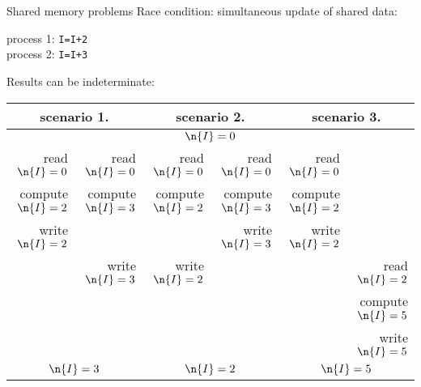 \begin{frame}[containsverbatim]{Shared memory problems}
Race condition: simultaneous update of shared data:
\begin{tabbing}
  process 1: \texttt{I=I+2}\\
  process 2: \texttt{I=I+3}
\end{tabbing}
Results can be indeterminate:

\tiny
\begin{tabular}{|rr|rr|rr|}
  \hline
  \multicolumn{2}{|c|}{scenario 1.}& \multicolumn{2}{|c|}{scenario 2.}&
  \multicolumn{2}{|c|}{scenario 3.}\\ \hline
  \multicolumn{6}{|c|}{$\n{I}=0$}\\ \hline
  read $\n{I}=0$&read $\n{I}=0$&
    read $\n{I}=0$&read $\n{I}=0$&
      read $\n{I}=0$& \\
  compute $\n{I}=2$&compute $\n{I}=3$& 
    compute $\n{I}=2$&compute $\n{I}=3$&
      compute $\n{I}=2$& \\
  write $\n{I}=2$& & &write $\n{I}=3$&write $\n{I}=2$& \\
  &write $\n{I}=3$&write $\n{I}=2$& & &read $\n{I}=2$\\
  &&&&&compute $\n{I}=5$\\
  &&&&&write $\n{I}=5$\\
  \hline
  \multicolumn{2}{|c|}{$\n{I}=3$}& \multicolumn{2}{|c|}{$\n{I}=2$}&
  \multicolumn{2}{|c|}{$\n{I}=5$}\\ \hline
\end{tabular}
\end{frame}

